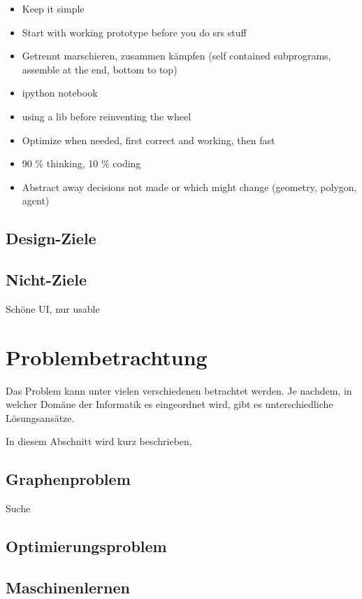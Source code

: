 \documentclass{article}
\begin{document}
\begin{itemize}
\item Keep it simple
\item Start with working prototype before you do srs stuff
\item Getrennt marschieren, zusammen kämpfen (self contained subprograms, assemble at the end, bottom to top)
\item ipython notebook
\item using a lib before reinventing the wheel
\item Optimize when needed, first correct and working, then fast
\item 90 \% thinking, 10 \% coding
\item Abstract away decisions not made or which might change (geometry, polygon, agent)
\end{itemize}

\subsection{Design-Ziele}

\subsection{Nicht-Ziele}

Schöne UI, nur usable

\clearpage
\section{Problembetrachtung}

Das Problem kann unter vielen verschiedenen betrachtet 
werden. Je nachdem, in welcher Domäne der Informatik
es eingeordnet wird, gibt es unterschiedliche Lösungsansätze.

In diesem Abschnitt wird kurz beschrieben, 

\subsection{Graphenproblem}

Suche

\subsection{Optimierungsproblem}

\subsection{Maschinenlernen}
\end{document}
